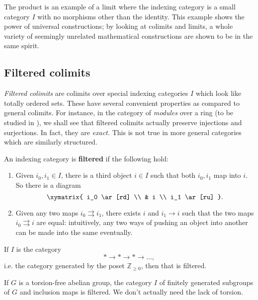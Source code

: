 \begin{proposition}
\begin{example} The product is an example of a limit where the indexing
category is a small category $I$ with no morphisms other than the identity. This
example
shows the power of universal constructions; by looking at colimits and limits,
a whole variety of seemingly unrelated mathematical constructions are shown
to be
in the same spirit.
\end{example}

\subsection{Filtered colimits}


\emph{Filtered colimits} are colimits
over special indexing categories $I$ which look like totally ordered sets.
These have several convenient properties as compared to general colimits.
For instance, in the category of \emph{modules} over a ring (to be studied in
), we shall see that filtered colimits actually
preserve injections and surjections. In fact, they are \emph{exact.} This is
not true in more general categories which are similarly structured.



\begin{definition}
An indexing category is \textbf{filtered} if the following hold:
\begin{enumerate}
\item Given $i_0, i_1 \in I$, there is a third object $i \in I$ such that both
$i_0, i_1$ map into $i$.
So there is a diagram
\[ \xymatrix{
i_0 \ar[rd] \\
& i \\
i_1 \ar[ru]
}.\]
\item Given any two maps $i_0 \rightrightarrows i_1$, there exists $i$ and $i_1
\to i$ such that the two maps $i_0 \rightrightarrows i$ are equal:
intuitively, any two ways
of pushing an object into another can be made into the same eventually.
\end{enumerate}
\end{definition}

\begin{example}
If $I$ is the category
\[ \ast \to \ast \to \ast \to \dots,  \]
i.e. the category generated by the poset $\mathbb{Z}_{\geq 0}$, then that is
filtered.
\end{example}


\begin{example}
If $G$ is a torsion-free abelian group, the category $I$ of finitely generated
subgroups of $G$ and inclusion maps is filtered. We don't actually need the
lack of torsion.
\end{example}


\end{proposition}
